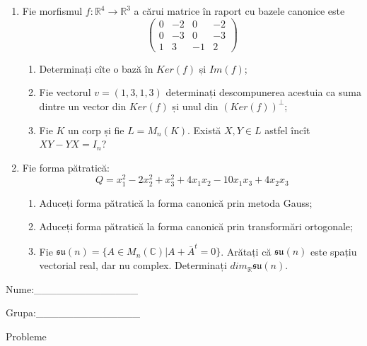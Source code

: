 \documentclass{article}
\begin{document}
\begin{enumerate}
 \item Fie morfismul $f:\mathbb{R}^4 \to \mathbb{R}^3$ a cărui matrice în raport cu bazele canonice este
$$\begin{pmatrix}
0&-2&0&-2\\
0&-3&0&-3\\
1&3&-1&2
\end{pmatrix}$$

\begin{enumerate}
\item Determinați cîte o bază în $Ker(f)$ și $Im(f)$;
\item Fie vectorul $v=(1,3,1,3)$ determinați descompunerea acestuia ca suma dintre un vector din $Ker(f)$ și unul din $(Ker(f))^\perp$;
\item Fie $K$ un corp și fie $L=M_n(K)$. Există $X,Y \in L$ astfel încît $XY-YX=I_n$?  
\end{enumerate}
\item Fie forma pătratică:
$$Q= x_1^2-2x_2^2+x_3^2+4x_1x_2-10x_1x_3+4x_2x_3$$

\begin{enumerate}
\item Aduceți forma pătratică la forma canonică prin metoda Gauss;
\item Aduceți forma pătratică la forma canonică prin transformări ortogonale;
\item Fie $\mathfrak{su}(n)=\{ A \in M_n(\mathbb{C}) | A+\bar{A}^t=0\}$. Arătați că $\mathfrak{su}(n)$ este spațiu vectorial real, dar nu complex.
Determinați $dim_{\mathbb{R}}\mathfrak{su}(n)$.
\end{enumerate}
\end{enumerate}
\newpage
\begin{flushright}
Nume:\_\_\_\_\_\_\_\_\_\_\_\_\_\_
 
 
Grupa:\_\_\_\_\_\_\_\_\_\_\_\_\_\_
\end{flushright}
\begin{center}
\vspace{2cm}
{\Large Probleme}
\vspace{2cm}
\end{center}
\end{document}
